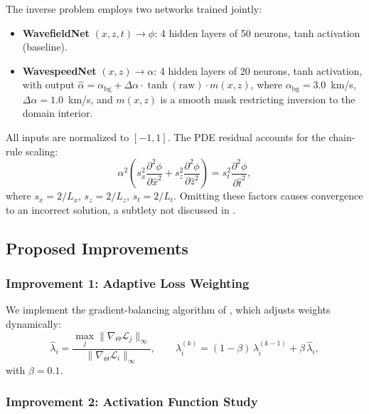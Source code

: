 \documentclass[11pt, letterpaper]{article}
\begin{document}
The inverse problem employs two networks trained jointly:
\begin{itemize}[nosep]
  \item \textbf{WavefieldNet} $(x,z,t) \to \phi$: 4 hidden layers of 50 neurons, tanh activation (baseline).
  \item \textbf{WavespeedNet} $(x,z) \to \alpha$: 4 hidden layers of 20 neurons, tanh activation, with output $\hat{\alpha} = \alpha_{\mathrm{bg}} + \Delta\alpha \cdot \tanh(\text{raw}) \cdot m(x,z)$, where $\alpha_{\text{bg}} = 3.0$~km/s, $\Delta\alpha = 1.0$~km/s, and $m(x,z)$ is a smooth mask restricting inversion to the domain interior.
\end{itemize}

All inputs are normalized to $[-1,1]$. The PDE residual accounts for the chain-rule scaling:
\begin{equation}
  \alpha^2 \left( s_x^2 \frac{\partial^2\phi}{\partial \hat{x}^2}
  + s_z^2 \frac{\partial^2\phi}{\partial \hat{z}^2} \right)
  = s_t^2 \frac{\partial^2\phi}{\partial \hat{t}^2},
  \label{eq:chain-rule}
\end{equation}
where $s_x = 2/L_x$, $s_z = 2/L_z$, $s_t = 2/L_t$.
Omitting these factors causes convergence to an incorrect solution, a subtlety not discussed in \citet{rashtbehesht2022}.

\subsection{Proposed Improvements}
\label{sec:improvements}

\subsubsection{Improvement 1: Adaptive Loss Weighting}
\label{sec:adaptive-weights}

We implement the gradient-balancing algorithm of \citet{wang2021understanding}, which adjusts weights dynamically:
\begin{equation}
  \hat{\lambda}_i = \frac{\max_j \|\nabla_\Theta \mathcal{L}_j\|_\infty}{\|\nabla_\Theta \mathcal{L}_i\|_\infty},
  \qquad
  \lambda_i^{(k)} = (1 - \beta)\,\lambda_i^{(k-1)} + \beta\,\hat{\lambda}_i,
  \label{eq:adaptive-weights}
\end{equation}
with $\beta = 0.1$.

\subsubsection{Improvement 2: Activation Function Study}
\label{sec:activations}
\end{document}
